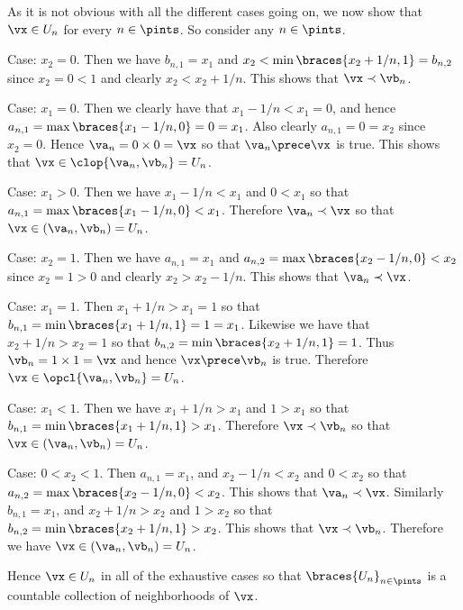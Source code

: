 {{    As it is not obvious with all the different cases going on, we now show that $\vx \in U_n$ for every $n \in \pints$.
    So consider any $n \in \pints$.

    Case: $x_2 = 0$.
    Then we have $b_{n,1} = x_1$ and $x_2 < \min\braces{x_2+1/n,1} = b_{n,2}$ since $x_2 = 0 < 1$ and clearly $x_2 < x_2+1/n$.
    This shows that $\vx \prec \vb_n$.
    \begin{indpar}
      Case: $x_1 = 0$.
      Then we clearly have that $x_1-1/n < x_1 = 0$, and hence $a_{n,1} = \max\braces{x_1-1/n,0} = 0 = x_1$.
      Also clearly $a_{n,1} = 0 = x_2$ since $x_2 = 0$.
      Hence $\va_n = 0 \times 0 = \vx$ so that $\va_n \prece \vx$ is true.
      This shows that $\vx \in \clop{\va_n,\vb_n} = U_n$.

      Case: $x_1 > 0$.
      Then we have $x_1-1/n < x_1$ and $0 < x_1$ so that $a_{n,1} = \max\braces{x_1-1/n,0} < x_1$.
      Therefore $\va_n \prec \vx$ so that $\vx \in (\va_n, \vb_n) = U_n$.
    \end{indpar}

    Case: $x_2 = 1$.
    Then we have $a_{n,1} = x_1$ and $a_{n,2} = \max\braces{x_2-1/n,0} < x_2$ since $x_2 = 1 > 0$ and clearly $x_2 > x_2-1/n$.
    This shows that $\va_n \prec \vx$.
    \begin{indpar}
      Case: $x_1 = 1$.
      Then $x_1+1/n > x_1 = 1$ so that $b_{n,1} = \min\braces{x_1+1/n,1} = 1 = x_1$.
      Likewise we have that $x_2+1/n > x_2 = 1$ so that $b_{n,2} = \min\braces{x_2+1/n, 1} = 1$.
      Thus $\vb_n = 1 \times 1 = \vx$ and hence $\vx \prece \vb_n$ is true.
      Therefore $\vx \in \opcl{\va_n, \vb_n} = U_n$.

      Case: $x_1 < 1$.
      Then we have $x_1+1/n > x_1$ and $1 > x_1$ so that $b_{n,1} = \min\braces{x_1+1/n,1} > x_1$.
      Therefore $\vx \prec \vb_n$ so that $\vx \in (\va_n, \vb_n) = U_n$.
    \end{indpar}

    Case: $0 < x_2 < 1$.
    Then $a_{n,1} = x_1$, and $x_2-1/n < x_2$ and $0 < x_2$ so that $a_{n,2} = \max\braces{x_2-1/n,0} < x_2$.
    This shows that $\va_n \prec \vx$.
    Similarly $b_{n,1} = x_1$, and $x_2+1/n > x_2$ and $1 > x_2$ so that $b_{n,2} = \min\braces{x_2+1/n,1} > x_2$.
    This shows that $\vx \prec \vb_n$.
    Therefore we have $\vx \in (\va_n,\vb_n) = U_n$.
    
    Hence $\vx \in U_n$ in all of the exhaustive cases so that $\braces{U_n}_{n \in \pints}$ is a countable collection of neighborhoods of $\vx$.

}}
